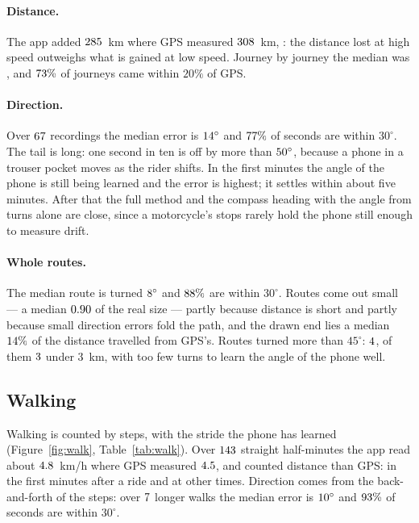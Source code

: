 \documentclass[11pt]{article}
\newcommand{\dg}{^\circ}
\begin{document}
\paragraph{Distance.} The app added $285$~km where GPS measured $308$~km, \nMotoDistTxt: the distance lost
at high speed outweighs what is gained at low speed. Journey by journey the median was \nMotoMedJourneyTxt,
and $73\%$ of journeys came within $20\%$ of GPS.

\paragraph{Direction.} Over $67$ recordings the median error is $\nMotoDirMed\dg$ and $77\%$ of seconds are within
$30\dg$. The tail is long: one second in ten is off by more than $\nMotoNinety\dg$, because a phone in a trouser pocket
moves as the rider shifts. In the first minutes the angle of the phone is still being learned and the
error is highest; it settles within about five minutes. After that the full method and the compass heading
with the angle from turns alone are close, since a motorcycle's stops rarely hold the phone still enough to
measure drift.

\paragraph{Whole routes.} The median route is turned $\nMotoRtMed\dg$ and $88\%$ are within $30\dg$. Routes come out
small --- a median $0.90$ of the real size --- partly because distance is short and partly because
small direction errors fold the path, and the drawn end lies a median $14\%$ of the distance
travelled from GPS's. Routes turned more than $45\dg$: $4$, of them $3$ under $3$~km, with too few
turns to learn the angle of the phone well.

\clearpage
\subsection{Walking}\label{sec:walk}\suppressfloats[t]



Walking is counted by steps, with the stride the phone has learned (Figure~\ref{fig:walk},
Table~\ref{tab:walk}). Over $143$ straight half-minutes the app read about $4.8$~km/h where GPS measured
$4.5$, and counted \nWalkDistTxt{} distance than GPS: \nWalkAfterTxt{} in the first minutes after a ride and
\nWalkOtherTxt{} at other times. Direction comes from the back-and-forth of the steps: over $7$ longer walks
the median error is $\nWalkDirMed\dg$ and $93\%$ of seconds are within $30\dg$.
\end{document}
